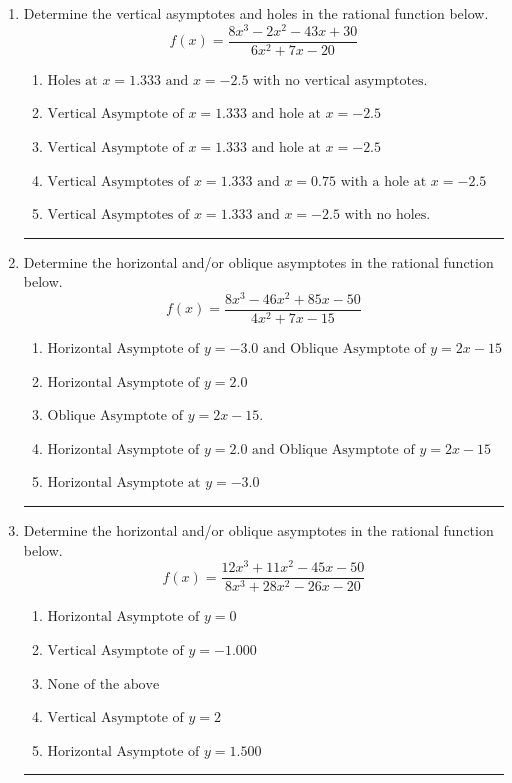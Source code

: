 \documentclass[14pt]{extbook}
\newcommand{\litem}[1]{\item#1\hspace*{-1cm}\rule{\textwidth}{0.4pt}}
\begin{document}
\begin{enumerate}
{\begin{enumerate}[label=\Alph*.]
\end{enumerate} }
\litem{
Determine the vertical asymptotes and holes in the rational function below.\[ f(x) = \frac{8x^{3} -2 x^{2} -43 x + 30}{6x^{2} +7 x -20} \]\begin{enumerate}[label=\Alph*.]
\item \( \text{Holes at } x = 1.333 \text{ and } x = -2.5 \text{ with no vertical asymptotes.} \)
\item \( \text{Vertical Asymptote of } x = 1.333 \text{ and hole at } x = -2.5 \)
\item \( \text{Vertical Asymptote of } x = 1.333 \text{ and hole at } x = -2.5 \)
\item \( \text{Vertical Asymptotes of } x = 1.333 \text{ and } x = 0.75 \text{ with a hole at } x = -2.5 \)
\item \( \text{Vertical Asymptotes of } x = 1.333 \text{ and } x = -2.5 \text{ with no holes.} \)

\end{enumerate} }
\litem{
Determine the horizontal and/or oblique asymptotes in the rational function below.\[ f(x) = \frac{8x^{3} -46 x^{2} +85 x -50}{4x^{2} +7 x -15} \]\begin{enumerate}[label=\Alph*.]
\item \( \text{Horizontal Asymptote of } y = -3.0 \text{ and Oblique Asymptote of } y = 2x -15 \)
\item \( \text{Horizontal Asymptote of } y = 2.0  \)
\item \( \text{Oblique Asymptote of } y = 2x -15. \)
\item \( \text{Horizontal Asymptote of } y = 2.0 \text{ and Oblique Asymptote of } y = 2x -15 \)
\item \( \text{Horizontal Asymptote at } y = -3.0 \)

\end{enumerate} }
\litem{
Determine the horizontal and/or oblique asymptotes in the rational function below.\[ f(x) = \frac{12x^{3} +11 x^{2} -45 x -50}{8x^{3} +28 x^{2} -26 x -20} \]\begin{enumerate}[label=\Alph*.]
\item \( \text{Horizontal Asymptote of } y = 0  \)
\item \( \text{Vertical Asymptote of } y = -1.000  \)
\item \( \text{None of the above} \)
\item \( \text{Vertical Asymptote of } y = 2  \)
\item \( \text{Horizontal Asymptote of } y = 1.500  \)


\end{enumerate}}
\end{enumerate}
\end{document}
